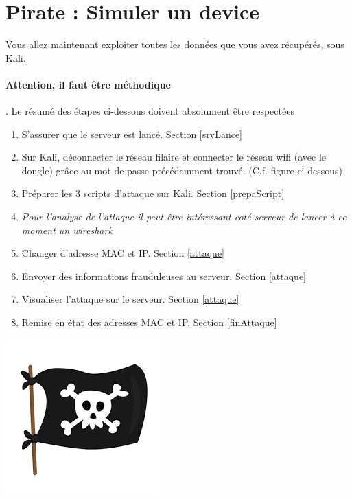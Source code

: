 \documentclass[french, 12pt]{article}%
\begin{document}
\newpage
\section{Pirate : Simuler un device}

Vous allez maintenant exploiter toutes les données que vous avez récupérés, sous Kali. 


\paragraph{Attention, il faut être méthodique}. Le résumé des étapes ci-dessous doivent absolument être respectées 

\begin{minipage}{0.65\linewidth}

\begin{enumerate}[label=\alph*.]
\item S'assurer que le serveur est lancé. Section \ref{srvLance}
\item Sur Kali, déconnecter le réseau filaire et connecter le réseau wifi (avec le dongle) grâce au mot de passe précédemment trouvé. (C.f. figure ci-dessous)

\item Préparer les 3 scripts d'attaque sur Kali. Section \ref{prepaScript}

\item \textit{Pour l'analyse de l'attaque il peut être intéressant coté serveur de lancer à ce moment un wireshark}

\item Changer d'adresse MAC et IP. Section \ref{attaque}
\item Envoyer des informations frauduleuses au serveur.  Section \ref{attaque}
\item Visualiser l'attaque sur le serveur. Section \ref{attaque}
\item Remise en état des adresses MAC et IP. Section \ref{finAttaque}
\end{enumerate}


\end{minipage}
\begin{minipage}{0.34\linewidth}
\begin{center}
\includegraphics[scale=0.5]{./ressource/logoHacker.png}
\end{center}
\end{minipage}
\end{document}
